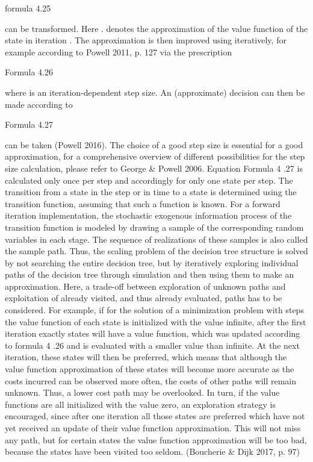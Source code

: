formula 4.25

can be transformed. Here . denotes the approximation of the value function of the state in iteration . The approximation is then improved using iteratively, for example according to Powell 2011, p. 127 via the prescription



Formula 4.26

where is an iteration-dependent step size. An (approximate) decision can then be made according to

Formula 4.27

can be taken (Powell 2016). The choice of a good step size is essential for a good approximation, for a comprehensive overview of different possibilities for the
step size calculation, please refer to George & Powell 2006. 
Equation Formula 4 .27 is calculated only once per step and accordingly for only one state per step. The transition from a state in the step or in time to a state is determined using the transition function, assuming that such a function is known. For a forward iteration implementation, the stochastic exogenous information process of the transition function is modeled by drawing a sample of the corresponding random variables in each stage. The sequence of realizations of these samples is also called the sample path. 
Thus, the scaling problem of the decision tree structure is solved by not searching the entire decision tree, but by iteratively exploring individual paths of the decision tree through simulation and then using them to make an approximation. Here, a trade-off between exploration of unknown paths and exploitation of already visited, and thus already evaluated, paths has to be considered. For example, if for the solution of a minimization problem with steps the value function of each state is initialized with the value infinite, after the first iteration exactly states will have a value function, which was updated according to formula 4 .26 and is evaluated with a smaller value than infinite. At the next iteration, these states will then be preferred, which means that although the value function approximation of these states will become more accurate as the costs incurred can be observed more often, the costs of other paths will remain unknown. Thus, a lower cost path may be overlooked. In turn, if the value functions are all initialized with the value zero, an exploration strategy is encouraged, since after one iteration all those states are preferred which have not yet received an update of their value function approximation. This will not miss any path, but for certain states the value function approximation will be too bad, because the states have been visited too seldom. (Boucherie & Dijk 2017, p. 97)
